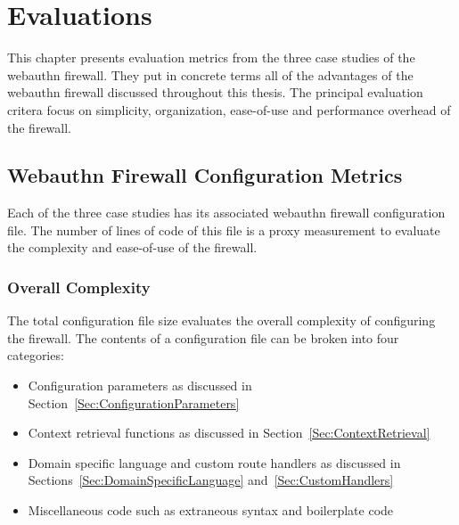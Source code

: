 
\chapter{Evaluations}\label{Chap:Evaluations}

This chapter presents evaluation metrics from the three case studies of the webauthn firewall. They put in concrete terms all of the advantages of the webauthn firewall discussed throughout this thesis. The principal evaluation critera focus on simplicity, organization, ease-of-use and performance overhead of the firewall.

\section{Webauthn Firewall Configuration Metrics}

Each of the three case studies has its associated webauthn firewall configuration file. The number of lines of code of this file is a proxy measurement to evaluate the complexity and ease-of-use of the firewall. 

\subsection{Overall Complexity}

The total configuration file size evaluates the overall complexity of configuring the firewall. The contents of a configuration file can be broken into four categories:

\begin{itemize}[nosep]

\item Configuration parameters as discussed in Section~\ref{Sec:ConfigurationParameters}

\item Context retrieval functions as discussed in Section~\ref{Sec:ContextRetrieval}

\item Domain specific language and custom route handlers as discussed in Sections~\ref{Sec:DomainSpecificLanguage} and~\ref{Sec:CustomHandlers}

\item Miscellaneous code such as extraneous syntax and boilerplate code

\end{itemize}

